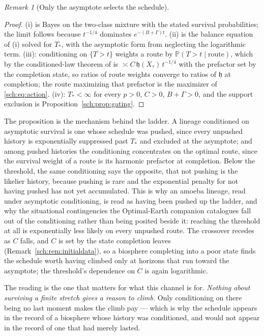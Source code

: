 \documentclass[11pt]{article}
\newcommand{\PP}{\mathbb{P}}
\newcommand{\hm}{\mathfrak{h}}
\theoremstyle{plain}
\theoremstyle{definition}
\theoremstyle{remark}
\newtheorem{remark}[theorem]{Remark}
\begin{document}
\begin{remark}[Only the asymptote selects the schedule]
\begin{proof}
(i) is Bayes on the two-class mixture with the stated survival
probabilities; the limit follows because $t^{-1/4}$ dominates
$e^{-(B+\Gamma)t}$. (ii) is the balance equation of (i) solved for
$T_\ast$, with the asymptotic form from neglecting the logarithmic
term. (iii): conditioning on $\{T>t\}$ weights a route by
$\PP(T>t\mid\text{route})$, which by the conditioned-law theorem of \cite{SurvA} is
$\asymp C\,\hm(X_\tau)\,t^{-1/4}$ with the prefactor set by the completion
state, so ratios of route weights converge to ratios of $\hm$ at
completion; the route maximizing that prefactor is the maximizer of
\eqref{sch:eq:action}. (iv): $T_\ast<\infty$ for every $p>0$, $C>0$,
$B+\Gamma>0$, and the support exclusion is
Proposition~\ref{sch:prop:gating}.
\end{proof}

The proposition is the mechanism behind the ladder. A lineage
conditioned on asymptotic survival is one whose schedule was pushed,
since every unpushed history is exponentially suppressed past $T_\ast$
and excluded at the asymptote; and among pushed histories the
conditioning concentrates on the optimal route, since the survival
weight of a route is its harmonic prefactor at completion. Below the
threshold, the same conditioning says the opposite, that not pushing is
the likelier history, because pushing is rare and the exponential
penalty for not having pushed has not yet accumulated. This is why an
amoeba lineage, read under asymptotic conditioning, is read as having
been pushed up the ladder, and why the situational contingencies the
Optimal-Earth companion catalogues fall out of the conditioning rather
than being posited beside it: reaching the threshold at all is
exponentially less likely on every unpushed route. The crossover
recedes as $C$ falls, and $C$ is set by the state completion leaves
(Remark~\ref{sch:rem:initialdata}), so a biosphere completing into a
poor state finds the schedule worth having climbed only at horizons
that run toward the asymptote; the threshold's dependence on $C$ is
again logarithmic.

The reading is the one that matters for what this channel is for.
\emph{Nothing about surviving a finite stretch gives a reason to climb.}
Only conditioning on there being no last moment makes the climb pay ---
which is why the schedule appears in the record of a biosphere whose
history was conditioned, and would not appear in the record of one that
had merely lasted.
\end{remark}
\end{document}
